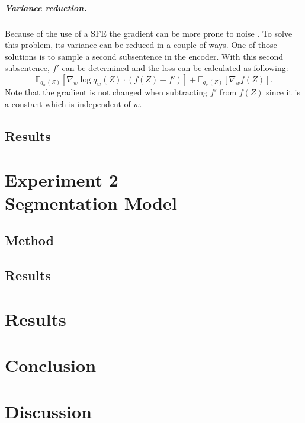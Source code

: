 \documentclass[a4paper, 12pt]{report}
\begin{document}
\paragraph{Variance reduction.} Because of the use of a SFE the gradient can be more prone to noise \cite{niculae2023discretelatentstructureneural}.
To solve this problem, its variance can be reduced in a couple of ways. 
One of those solutions is to sample a second subsentence in the encoder. 
With this second subsentence, $f'$ can be determined and the loss can be calculated as following:
\begin{equation}
    \mathbb{E}_{q_w(Z)} [\nabla_w \log q_w(Z) \cdot (f(Z)-f')] + \mathbb{E}_{q_w(Z)} [\nabla_w f(Z)].
\end{equation}
Note that the gradient is not changed when subtracting $f'$ from $f(Z)$ since it is a constant which is independent of $w$.


\section{Results}

\chapter{Experiment 2 \\ Segmentation Model}
\section{Method}
\section{Results}

\chapter{Results}

\chapter{Conclusion}

\chapter{Discussion}




\appendix
\end{document}
